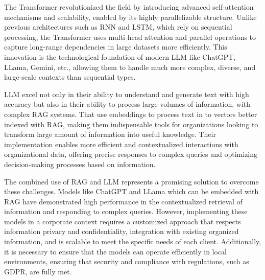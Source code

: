The Transformer revolutionized the field by introducing advanced self-attention mechanisms and scalability, enabled by its highly parallelizable structure. Unlike previous architectures such as \ac{RNN} and \ac{LSTM}, which rely on sequential processing, the Transformer uses multi-head attention and parallel operations to capture long-range dependencies in large datasets more efficiently. This innovation is the technological foundation of modern \ac{LLM} like ChatGPT, LLama, Gemini, etc., allowing them to handle much more complex, diverse, and large-scale contexts than sequential types.

\ac{LLM} excel not only in their ability to understand and generate text with high accuracy but also in their ability to process large volumes of information, with complex \ac{RAG} systems. That use embeddings to process text in to vectors better indexed with \ac{RAG}, making them indispensable tools for organizations looking to transform large amount of information into useful knowledge. Their implementation enables more efficient and contextualized interactions with organizational data, offering precise responses to complex queries and optimizing decision-making processes based on information.

The combined use of \ac{RAG} and \ac{LLM} represents a promising solution to overcome these challenges. Models like ChatGPT and LLama which can be embedded with \ac{RAG} have demonstrated high performance in the contextualized retrieval of information and responding to complex queries. However, implementing these models in a corporate context requires a customized approach that respects information privacy and confidentiality, integration with existing organized information, and is scalable to meet the specific needs of each client. Additionally, it is necessary to ensure that the models can operate efficiently in local environments, ensuring that security and compliance with regulations, such as \ac{GDPR}, are fully met.

